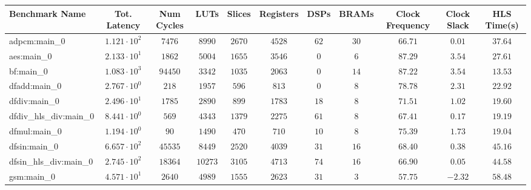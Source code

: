\begin{tabular}{|l|c|c|c|c|c|c|c|c|c|c|}
\hline
Benchmark Name          & Tot. Latency           & Num Cycles & LUTs      & Slices    & Registers & DSPs    & BRAMs   & Clock Frequency & Clock Slack & HLS Time(s) \\
\hline
adpcm:main\_0           & $ 1.121 \cdot 10^{2} $ & $ 7476   $ & $ 8990  $ & $ 2670  $ & $ 4528  $ & $ 62  $ & $ 30  $ & $ 66.71       $ & $ 0.01    $ & $ 37.64   $ \\
aes:main\_0             & $ 2.133 \cdot 10^{1} $ & $ 1862   $ & $ 5004  $ & $ 1655  $ & $ 3546  $ & $ 0   $ & $ 6   $ & $ 87.29       $ & $ 3.54    $ & $ 27.61   $ \\
bf:main\_0              & $ 1.083 \cdot 10^{3} $ & $ 94450  $ & $ 3342  $ & $ 1035  $ & $ 2063  $ & $ 0   $ & $ 14  $ & $ 87.22       $ & $ 3.54    $ & $ 13.53   $ \\
dfadd:main\_0           & $ 2.767 \cdot 10^{0} $ & $ 218    $ & $ 1957  $ & $ 596   $ & $ 813   $ & $ 0   $ & $ 8   $ & $ 78.78       $ & $ 2.31    $ & $ 22.92   $ \\
dfdiv:main\_0           & $ 2.496 \cdot 10^{1} $ & $ 1785   $ & $ 2890  $ & $ 899   $ & $ 1783  $ & $ 18  $ & $ 8   $ & $ 71.51       $ & $ 1.02    $ & $ 19.60   $ \\
dfdiv\_hls\_div:main\_0 & $ 8.441 \cdot 10^{0} $ & $ 569    $ & $ 4343  $ & $ 1379  $ & $ 2275  $ & $ 61  $ & $ 8   $ & $ 67.41       $ & $ 0.17    $ & $ 19.19   $ \\
dfmul:main\_0           & $ 1.194 \cdot 10^{0} $ & $ 90     $ & $ 1490  $ & $ 470   $ & $ 710   $ & $ 10  $ & $ 8   $ & $ 75.39       $ & $ 1.73    $ & $ 19.04   $ \\
dfsin:main\_0           & $ 6.657 \cdot 10^{2} $ & $ 45535  $ & $ 8449  $ & $ 2520  $ & $ 4039  $ & $ 31  $ & $ 16  $ & $ 68.40       $ & $ 0.38    $ & $ 45.16   $ \\
dfsin\_hls\_div:main\_0 & $ 2.745 \cdot 10^{2} $ & $ 18364  $ & $ 10273 $ & $ 3105  $ & $ 4713  $ & $ 74  $ & $ 16  $ & $ 66.90       $ & $ 0.05    $ & $ 44.58   $ \\
gsm:main\_0             & $ 4.571 \cdot 10^{1} $ & $ 2640   $ & $ 4989  $ & $ 1555  $ & $ 2623  $ & $ 31  $ & $ 3   $ & $ 57.75       $ & $ -2.32   $ & $ 58.48   $ \\

\end{tabular}
